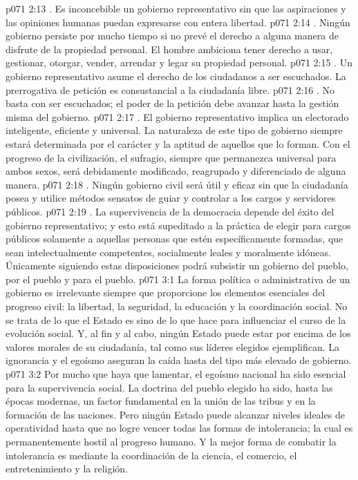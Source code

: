\vs p071 2:13 . Es inconcebible un gobierno representativo sin que las aspiraciones y las opiniones humanas puedan expresarse con entera libertad.
\vs p071 2:14 . Ningún gobierno persiste por mucho tiempo si no prevé el derecho a alguna manera de disfrute de la propiedad personal. El hombre ambiciona tener derecho a usar, gestionar, otorgar, vender, arrendar y legar su propiedad personal.
\vs p071 2:15 . Un gobierno representativo asume el derecho de los ciudadanos a ser escuchados. La prerrogativa de petición es consustancial a la ciudadanía libre.
\vs p071 2:16 . No basta con ser escuchados; el poder de la petición debe avanzar hasta la gestión misma del gobierno.
\vs p071 2:17 . El gobierno representativo implica un electorado inteligente, eficiente y universal. La naturaleza de este tipo de gobierno siempre estará determinada por el carácter y la aptitud de aquellos que lo forman. Con el progreso de la civilización, el sufragio, siempre que permanezca universal para ambos sexos, será debidamente modificado, reagrupado y diferenciado de alguna manera.
\vs p071 2:18 . Ningún gobierno civil será útil y eficaz sin que la ciudadanía posea y utilice métodos sensatos de guiar y controlar a los cargos y servidores públicos.
\vs p071 2:19 . La supervivencia de la democracia depende del éxito del gobierno representativo; y esto está supeditado a la práctica de elegir para cargos públicos solamente a aquellas personas que estén específicamente formadas, que sean intelectualmente competentes, socialmente leales y moralmente idóneas. Únicamente siguiendo estas disposiciones podrá subsistir un gobierno del pueblo, por el pueblo y para el pueblo.
\vs p071 3:1 La forma política o administrativa de un gobierno es irrelevante siempre que proporcione los elementos esenciales del progreso civil: la libertad, la seguridad, la educación y la coordinación social. No se trata de lo que el Estado es sino de lo que hace para influenciar el curso de la evolución social. Y, al fin y al cabo, ningún Estado puede estar por encima de los valores morales de su ciudadanía, tal como sus líderes elegidos ejemplifican. La ignorancia y el egoísmo aseguran la caída hasta del tipo más elevado de gobierno.
\vs p071 3:2 Por mucho que haya que lamentar, el egoísmo nacional ha sido esencial para la supervivencia social. La doctrina del pueblo elegido ha sido, hasta las épocas modernas, un factor fundamental en la unión de las tribus y en la formación de las naciones. Pero ningún Estado puede alcanzar niveles ideales de operatividad hasta que no logre vencer todas las formas de intolerancia; la cual es permanentemente hostil al progreso humano. Y la mejor forma de combatir la intolerancia es mediante la coordinación de la ciencia, el comercio, el entretenimiento y la religión.
